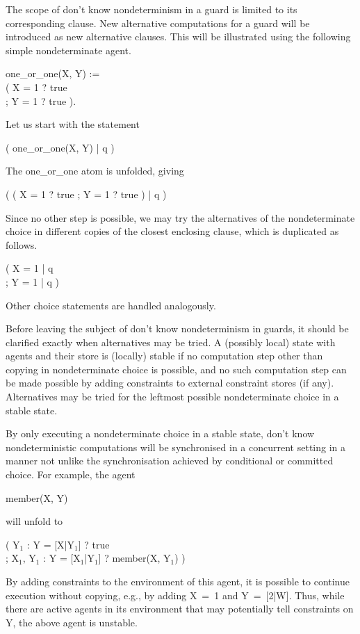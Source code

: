 The scope of don't know nondeterminism in a guard is limited to its
corresponding clause.  New alternative computations for a guard will be
introduced as new alternative clauses.  This will be illustrated using
the following simple nondeterminate agent.
%
\begin{program}
one_or_one(X, Y) := \\
\>\>( X = 1 ? true \\
\>\>; Y = 1 ? true ).
\end{program}%
%
Let us start with the statement
%
\begin{progex}
( one_or_one(X, Y) | q )
\end{progex}%
%
The {\prog one_or_one} atom is unfolded, giving
%
\begin{progex}
( ( X = 1 ? true ; Y = 1 ? true ) | q )
\end{progex}%
%
Since no other step is possible, we may try the alternatives of the
nondeterminate choice in different copies of the closest enclosing
clause, which is duplicated as follows.
%
\begin{progex}
( X = 1 | q \\
; Y = 1 | q )
\end{progex}%
%
Other choice statements are handled analogously.

Before leaving the subject of don't know nondeterminism in guards, it
should be clarified exactly when alternatives may be tried.  A
(possibly local) state with agents and their store is (locally) stable
if no computation step other than copying in nondeterminate choice is
possible, and no such computation step can be made possible by adding
constraints to external constraint stores (if any).  Alternatives may
be tried for the leftmost possible nondeterminate choice in a stable
state.

By only executing a nondeterminate choice in a stable state, don't
know nondeterministic computations will be synchronised in a
concurrent setting in a manner not unlike the synchronisation achieved
by conditional or committed choice.  For example, the agent
%
\begin{progex}
member(X, Y)
\end{progex}%
%
will unfold to
%
\begin{progex}
( Y$_1$ : Y = [X|Y$_1$] ? true \\
; X$_1$, Y$_1$ : Y = [X$_1$|Y$_1$] ? member(X, Y$_1$) )
\end{progex}%
%
By adding constraints to the environment of this agent, it is possible
to continue execution without copying, e.g., by adding {\prog X~=~1}
and {\prog Y~=~[2|W]}.  Thus, while there are active agents in its
environment that may potentially tell constraints on {\prog Y}, the above
agent is unstable.

